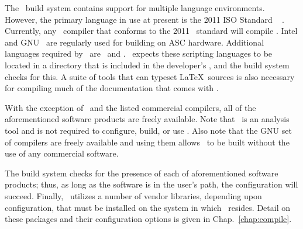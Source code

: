 The \draco\ build system contains support for multiple language
environments.  However, the primary language in use at present is the
2011 ISO Standard \cpp~\cite{ansi:cpp} . Currently, any \cpp\ compiler that conforms to the 2011
\cpp\ standard will compile \draco. Intel and GNU \cpp\ are regularly
used for building on ASC hardware.  Additional languages required by
\draco\ are \python\ and .  \draco\ expects these scripting
languages to be located in a directory that is included in the
developer's , and the build system checks for this.  A
suite of tools that can typeset \LaTeX\ sources is also necessary for
compiling much of the documentation that comes with \draco.
  

With the exception of \bullseye\ and the listed commercial compilers,
all of the aforementioned software products are freely available.
Note that \bullseye\ is an analysis tool and is not required to
configure, build, or use \draco.  Also note that the GNU set of
compilers are freely available and using them allows \draco\ to be
built without the use of any commercial software.

The build system checks for the presence of each of aforementioned
software products; thus, as long as the software is in the user's
path, the configuration will succeed.  Finally, \draco\ utilizes a
number of vendor libraries, depending upon configuration, that must be
installed on the system in which \draco\ resides.  Detail on these
packages and their configuration options is given in
Chap.~\ref{chap:compile}.

